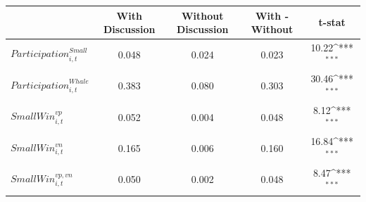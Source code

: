{
\def\sym#1{\ifmmode^{#1}\else\(^{#1}\)\fi}
\begin{tabular}{l*{1}{cccc}}
\toprule
                    &With Discussion&Without Discussion&With - Without&      t-stat         \\
\midrule
$\mathit{Participation}^{Small}_{i,t}$&           0.048&           0.024&          0.023&           10.22\sym{***}\\
$\mathit{Participation}^{Whale}_{i,t}$&           0.383&           0.080&          0.303&           30.46\sym{***}\\
$\mathit{Small Win}^{vp}_{i,t}$&           0.052&           0.004&          0.048&            8.12\sym{***}\\
$\mathit{Small Win}^{vn}_{i,t}$&           0.165&           0.006&          0.160&           16.84\sym{***}\\
$\mathit{Small Win}^{vp,vn}_{i,t}$&           0.050&           0.002&          0.048&            8.47\sym{***}\\
\bottomrule
\end{tabular}
}
